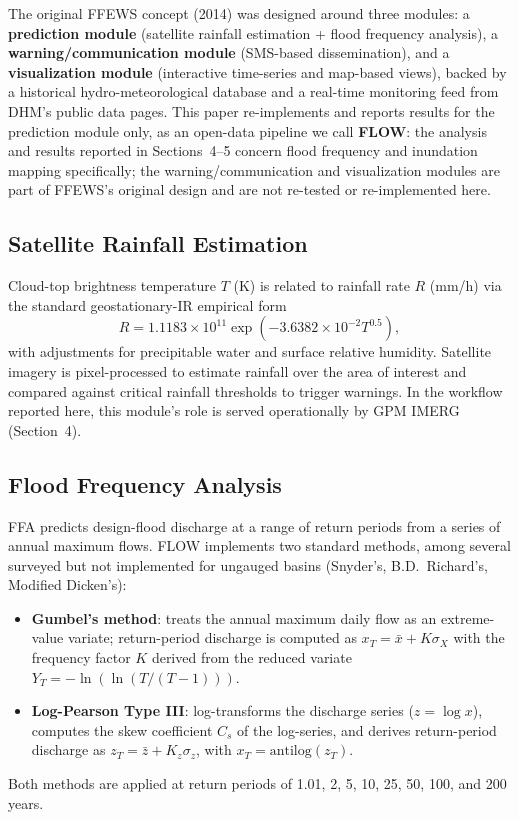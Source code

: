 \documentclass[11pt]{article}
\begin{document}
The original FFEWS concept (2014) was designed around three modules: a \textbf{prediction module} (satellite rainfall estimation + flood frequency analysis), a \textbf{warning/communication module} (SMS-based dissemination), and a \textbf{visualization module} (interactive time-series and map-based views), backed by a historical hydro-meteorological database and a real-time monitoring feed from DHM's public data pages. This paper re-implements and reports results for the prediction module only, as an open-data pipeline we call \textbf{FLOW}: the analysis and results reported in Sections~4--5 concern flood frequency and inundation mapping specifically; the warning/communication and visualization modules are part of FFEWS's original design and are not re-tested or re-implemented here.

\subsection{Satellite Rainfall Estimation}
Cloud-top brightness temperature $T$ (K) is related to rainfall rate $R$ (mm/h) via the standard geostationary-IR empirical form
\begin{equation}
R = 1.1183\times10^{11}\exp\left(-3.6382\times10^{-2}T^{0.5}\right),
\end{equation}
with adjustments for precipitable water and surface relative humidity. Satellite imagery is pixel-processed to estimate rainfall over the area of interest and compared against critical rainfall thresholds to trigger warnings. In the workflow reported here, this module's role is served operationally by GPM IMERG (Section~4).

\subsection{Flood Frequency Analysis}
FFA predicts design-flood discharge at a range of return periods from a series of annual maximum flows. FLOW implements two standard methods, among several surveyed but not implemented for ungauged basins (Snyder's, B.D.\ Richard's, Modified Dicken's):
\begin{itemize}
\item \textbf{Gumbel's method}: treats the annual maximum daily flow as an extreme-value variate; return-period discharge is computed as $x_T=\bar{x}+K\sigma_X$ with the frequency factor $K$ derived from the reduced variate $Y_T=-\ln(\ln(T/(T-1)))$.
\item \textbf{Log-Pearson Type III}: log-transforms the discharge series ($z=\log x$), computes the skew coefficient $C_s$ of the log-series, and derives return-period discharge as $z_T=\bar{z}+K_z\sigma_z$, with $x_T=\mathrm{antilog}(z_T)$.
\end{itemize}
Both methods are applied at return periods of 1.01, 2, 5, 10, 25, 50, 100, and 200 years.
\end{document}
